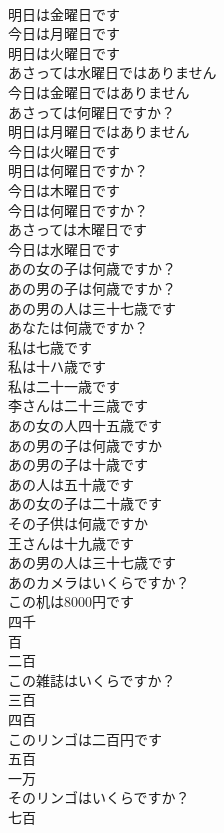 \documentclass[8pt]{extreport}
\begin{document}
\begin{CJK}{UTF8}{min}
\\	明日は金曜日です	
\\	今日は月曜日です	
\\	明日は火曜日です	
\\	あさっては水曜日ではありません	
\\	今日は金曜日ではありません	
\\	あさっては何曜日ですか？	
\\	明日は月曜日ではありません	
\\	今日は火曜日です	
\\	明日は何曜日ですか？	
\\	今日は木曜日です	
\\	今日は何曜日ですか？	
\\	あさっては木曜日です	
\\	今日は水曜日です	
\\	あの女の子は何歳ですか？	
\\	あの男の子は何歳ですか？	
\\	あの男の人は三十七歳です	
\\	あなたは何歳ですか？	
\\	私は七歳です	
\\	私は十ハ歳です	
\\	私は二十一歳です	
\\	李さんは二十三歳です	
\\	あの女の人四十五歳です	
\\	あの男の子は何歳ですか	
\\	あの男の子は十歳です	
\\	あの人は五十歳です	
\\	あの女の子は二十歳です	
\\	その子供は何歳ですか	
\\	王さんは十九歳です	
\\	あの男の人は三十七歳です	
\\	あのカメラはいくらですか？	
\\	この机は8000円です	
\\	四千	
\\	百	
\\	二百	
\\	この雑誌はいくらですか？	
\\	三百	
\\	四百	
\\	このリンゴは二百円です	
\\	五百	
\\	一万	
\\	そのリンゴはいくらですか？	
\\	七百	

\end{CJK}
\end{document}
